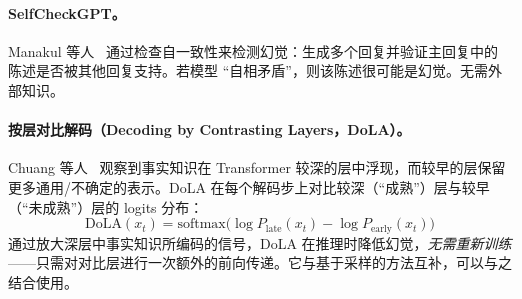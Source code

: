 \paragraph{SelfCheckGPT。}
\label{selfcheckgpt.}

Manakul 等人~\cite{manakul2023selfcheckgpt} 通过检查自一致性来检测幻觉：生成多个回复并验证主回复中的陈述是否被其他回复支持。若模型 ``自相矛盾''，则该陈述很可能是幻觉。无需外部知识。

\paragraph{按层对比解码（Decoding by Contrasting Layers，DoLA）。}
\label{dola-decoding-by-contrasting-layers.}

Chuang 等人~\cite{chuang2024dola} 观察到事实知识在 Transformer 较深的层中浮现，而较早的层保留更多通用/不确定的表示。DoLA 在每个解码步上对比较深（``成熟''）层与较早（``未成熟''）层的 logits 分布：
\[
\text{DoLA}(x_t) = \text{softmax}\!\bigl(\log P_{\text{late}}(x_t) - \log P_{\text{early}}(x_t)\bigr)
\]
通过放大深层中事实知识所编码的信号，DoLA 在推理时降低幻觉，\emph{无需重新训练}——只需对对比层进行一次额外的前向传递。它与基于采样的方法互补，可以与之结合使用。

